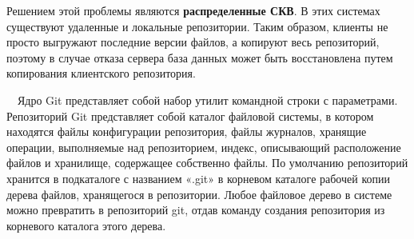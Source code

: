 \documentclass{article}
\begin{document}
Решением этой проблемы являются \textbf{распределенные СКВ}. В этих системах существуют удаленные и локальные репозитории.
Таким образом, клиенты не просто выгружают последние версии файлов, а копируют весь репозиторий, поэтому в случае отказа сервера база данных может быть восстановлена путем копирования клиентского репозитория.

\begin{figure}[h]
\end{figure}

~\
Ядро Git представляет собой набор утилит командной строки с параметрами.
Репозиторий Git представляет собой каталог файловой системы, в котором находятся файлы конфигурации репозитория, файлы журналов, хранящие операции, выполняемые над репозиторием, индекс, описывающий расположение файлов и хранилище, содержащее собственно файлы. По умолчанию репозиторий хранится в подкаталоге с названием «.git» в корневом каталоге рабочей копии дерева файлов, хранящегося в репозитории. Любое файловое дерево в системе можно превратить в репозиторий git, отдав команду создания репозитория из корневого каталога этого дерева.

\newpage
\end{document}
